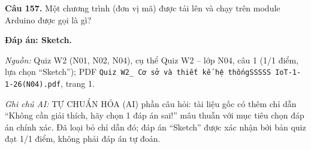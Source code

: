 \documentclass[11pt,a4paper]{article}
\begin{document}
\textbf{Câu 157.} Một chương trình (đơn vị mã) được tải lên và chạy trên module Arduino được gọi là gì?\par
{\color{answer}\textbf{Đáp án: Sketch.}}\par
{\footnotesize\color{sourcegray}\textit{Nguồn:} Quiz W2 (N01, N02, N04), cụ thể Quiz W2 – lớp N04, câu 1 (1/1 điểm, lựa chọn “Sketch”); PDF \texttt{Quiz W2\_ Cơ sở và thiết kế hệ thốngSSSSS IoT-1-1-26(N04).pdf}, trang 1.\par}
{\footnotesize\color{sourcegray}\textit{Ghi chú AI:} TỰ CHUẨN HÓA (AI) phần câu hỏi: tài liệu gốc có thêm chỉ dẫn “Không cần giải thích, hãy chọn 1 đáp án sai!” mâu thuẫn với mục tiêu chọn đáp án chính xác. Đã loại bỏ chỉ dẫn đó; đáp án “Sketch” được xác nhận bởi bản quiz đạt 1/1 điểm, không phải đáp án tự đoán.\par}
\vspace{3pt}\par\noindent{\color{black!18}\rule{\linewidth}{0.3pt}}\par\medskip
\end{document}
